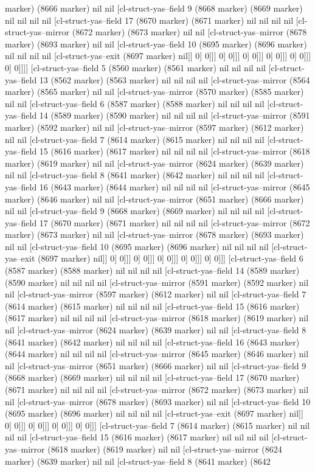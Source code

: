 {{marker) (8666 marker) nil nil [cl-struct-yas--field 9 (8668 marker) (8669 marker) nil nil nil nil [cl-struct-yas--field 17 (8670 marker) (8671 marker) nil nil nil nil [cl-struct-yas--mirror (8672 marker) (8673 marker) nil nil [cl-struct-yas--mirror (8678 marker) (8693 marker) nil nil [cl-struct-yas--field 10 (8695 marker) (8696 marker) nil nil nil nil [cl-struct-yas--exit (8697 marker) nil]] 0] 0]]] 0] 0]]] 0] 0]]] 0] 0]]] 0] 0]]] 0] 0]]]] [cl-struct-yas--field 5 (8560 marker) (8561 marker) nil nil nil nil [cl-struct-yas--field 13 (8562 marker) (8563 marker) nil nil nil nil [cl-struct-yas--mirror (8564 marker) (8565 marker) nil nil [cl-struct-yas--mirror (8570 marker) (8585 marker) nil nil [cl-struct-yas--field 6 (8587 marker) (8588 marker) nil nil nil nil [cl-struct-yas--field 14 (8589 marker) (8590 marker) nil nil nil nil [cl-struct-yas--mirror (8591 marker) (8592 marker) nil nil [cl-struct-yas--mirror (8597 marker) (8612 marker) nil nil [cl-struct-yas--field 7 (8614 marker) (8615 marker) nil nil nil nil [cl-struct-yas--field 15 (8616 marker) (8617 marker) nil nil nil nil [cl-struct-yas--mirror (8618 marker) (8619 marker) nil nil [cl-struct-yas--mirror (8624 marker) (8639 marker) nil nil [cl-struct-yas--field 8 (8641 marker) (8642 marker) nil nil nil nil [cl-struct-yas--field 16 (8643 marker) (8644 marker) nil nil nil nil [cl-struct-yas--mirror (8645 marker) (8646 marker) nil nil [cl-struct-yas--mirror (8651 marker) (8666 marker) nil nil [cl-struct-yas--field 9 (8668 marker) (8669 marker) nil nil nil nil [cl-struct-yas--field 17 (8670 marker) (8671 marker) nil nil nil nil [cl-struct-yas--mirror (8672 marker) (8673 marker) nil nil [cl-struct-yas--mirror (8678 marker) (8693 marker) nil nil [cl-struct-yas--field 10 (8695 marker) (8696 marker) nil nil nil nil [cl-struct-yas--exit (8697 marker) nil]] 0] 0]]] 0] 0]]] 0] 0]]] 0] 0]]] 0] 0]]] [cl-struct-yas--field 6 (8587 marker) (8588 marker) nil nil nil nil [cl-struct-yas--field 14 (8589 marker) (8590 marker) nil nil nil nil [cl-struct-yas--mirror (8591 marker) (8592 marker) nil nil [cl-struct-yas--mirror (8597 marker) (8612 marker) nil nil [cl-struct-yas--field 7 (8614 marker) (8615 marker) nil nil nil nil [cl-struct-yas--field 15 (8616 marker) (8617 marker) nil nil nil nil [cl-struct-yas--mirror (8618 marker) (8619 marker) nil nil [cl-struct-yas--mirror (8624 marker) (8639 marker) nil nil [cl-struct-yas--field 8 (8641 marker) (8642 marker) nil nil nil nil [cl-struct-yas--field 16 (8643 marker) (8644 marker) nil nil nil nil [cl-struct-yas--mirror (8645 marker) (8646 marker) nil nil [cl-struct-yas--mirror (8651 marker) (8666 marker) nil nil [cl-struct-yas--field 9 (8668 marker) (8669 marker) nil nil nil nil [cl-struct-yas--field 17 (8670 marker) (8671 marker) nil nil nil nil [cl-struct-yas--mirror (8672 marker) (8673 marker) nil nil [cl-struct-yas--mirror (8678 marker) (8693 marker) nil nil [cl-struct-yas--field 10 (8695 marker) (8696 marker) nil nil nil nil [cl-struct-yas--exit (8697 marker) nil]] 0] 0]]] 0] 0]]] 0] 0]]] 0] 0]]] [cl-struct-yas--field 7 (8614 marker) (8615 marker) nil nil nil nil [cl-struct-yas--field 15 (8616 marker) (8617 marker) nil nil nil nil [cl-struct-yas--mirror (8618 marker) (8619 marker) nil nil [cl-struct-yas--mirror (8624 marker) (8639 marker) nil nil [cl-struct-yas--field 8 (8641 marker) (8642 }}

